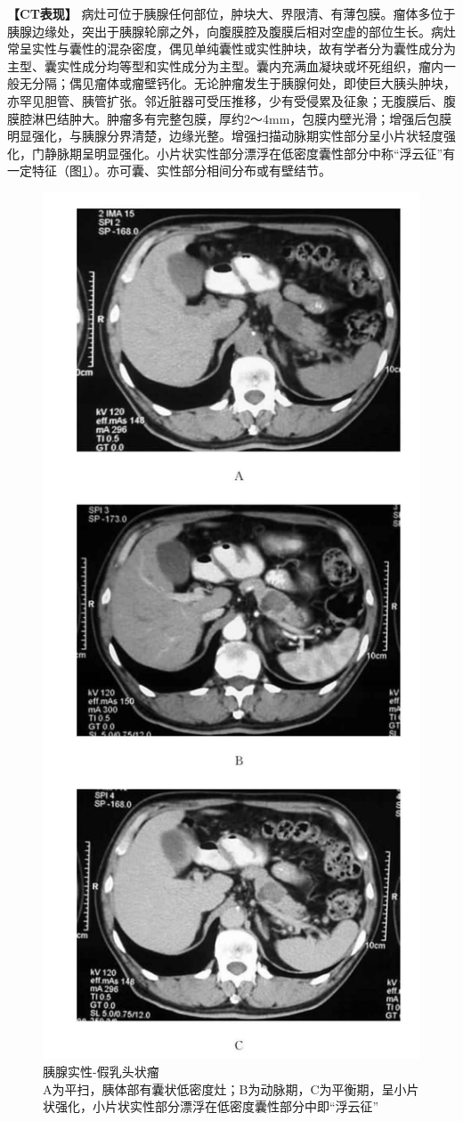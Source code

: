 \textbf{【CT表现】}
病灶可位于胰腺任何部位，肿块大、界限清、有薄包膜。瘤体多位于胰腺边缘处，突出于胰腺轮廓之外，向腹膜腔及腹膜后相对空虚的部位生长。病灶常呈实性与囊性的混杂密度，偶见单纯囊性或实性肿块，故有学者分为囊性成分为主型、囊实性成分均等型和实性成分为主型。囊内充满血凝块或坏死组织，瘤内一般无分隔；偶见瘤体或瘤壁钙化。无论肿瘤发生于胰腺何处，即使巨大胰头肿块，亦罕见胆管、胰管扩张。邻近脏器可受压推移，少有受侵累及征象；无腹膜后、腹膜腔淋巴结肿大。肿瘤多有完整包膜，厚约2～4mm，包膜内壁光滑；增强后包膜明显强化，与胰腺分界清楚，边缘光整。增强扫描动脉期实性部分呈小片状轻度强化，门静脉期呈明显强化。小片状实性部分漂浮在低密度囊性部分中称“浮云征”有一定特征（图\ref{fig13-7}）。亦可囊、实性部分相间分布或有壁结节。

\begin{figure}[!htbp]
 \centering
 \includegraphics[width=.7\textwidth,height=\textheight,keepaspectratio]{./images/Image00308.jpg}
 \captionsetup{justification=centering}
 \caption{胰腺实性-假乳头状瘤\\{\small A为平扫，胰体部有囊状低密度灶；B为动脉期，C为平衡期，呈小片状强化，小片状实性部分漂浮在低密度囊性部分中即“浮云征”}}
 \label{fig13-7}
  \end{figure} 

